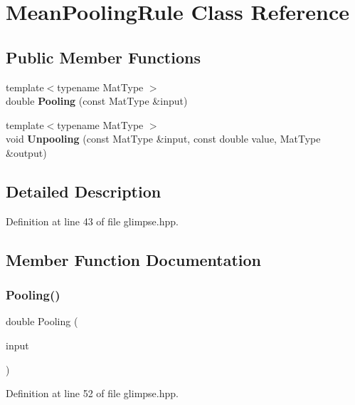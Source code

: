 \section{Mean\+Pooling\+Rule Class Reference}
\label{classmlpack_1_1ann_1_1MeanPoolingRule}
\subsection*{Public Member Functions}
\begin{DoxyCompactItemize}
\item 
{\footnotesize template$<$typename Mat\+Type $>$ }\\double \textbf{ Pooling} (const Mat\+Type \&input)
\item 
{\footnotesize template$<$typename Mat\+Type $>$ }\\void \textbf{ Unpooling} (const Mat\+Type \&input, const double value, Mat\+Type \&output)
\end{DoxyCompactItemize}


\subsection{Detailed Description}


Definition at line 43 of file glimpse.\+hpp.



\subsection{Member Function Documentation}
\mbox{\label{classmlpack_1_1ann_1_1MeanPoolingRule_af8f244d24fed0fa902eee94b0ace7df0}} 
\subsubsection{Pooling()}
{\footnotesize\ttfamily double Pooling (\begin{DoxyParamCaption}\item[{const Mat\+Type \&}]{input }\end{DoxyParamCaption})\hspace{0.3cm}{\ttfamily [inline]}}



Definition at line 52 of file glimpse.\+hpp.



